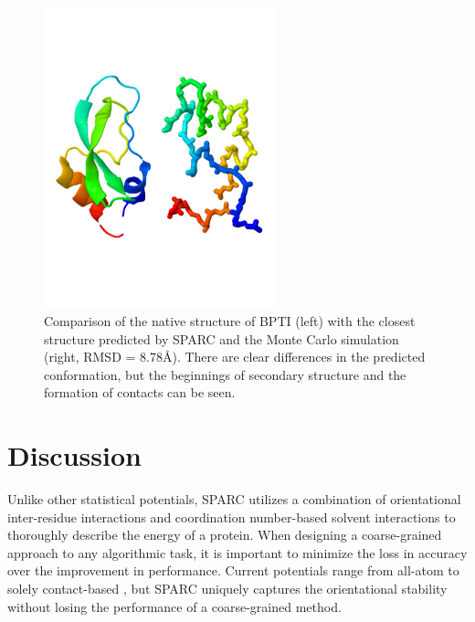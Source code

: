 \documentclass[11pt,titlepage]{article}
\begin{document}
\begin{figure}
	\begin{center}
		\includegraphics[width=0.6\textwidth, trim=0 5.5cm 0 5.5cm, clip=true]{bpti_structures}
	\end{center}
	\caption{Comparison of the native structure of BPTI (left) with the closest structure predicted by SPARC and the Monte Carlo simulation (right, RMSD = 8.78\AA). There are clear differences in the predicted conformation, but the beginnings of secondary structure and the formation of contacts can be seen.}
	\label{bpti_structures}
\end{figure}

\section{Discussion}
Unlike other statistical potentials, SPARC utilizes a combination of orientational inter-residue interactions and coordination number-based solvent interactions to thoroughly describe the energy of a protein.
When designing a coarse-grained approach to any algorithmic task, it is important to minimize the loss in accuracy over the improvement in performance.
Current potentials range from all-atom \cite{basdevant} to solely contact-based \cite{buchete2}, but SPARC uniquely captures the orientational stability without losing the performance of a coarse-grained method.
\end{document}

